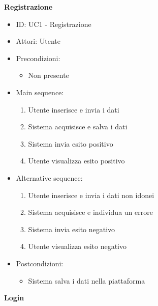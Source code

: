 \documentclass{article}
\begin{document}
\newpage
\textbf{Registrazione}
\begin{itemize}[label = { }]
    \itemsep0px
    \item ID: UC1 - Registrazione
    \item Attori: Utente
    \item Precondizioni: 
        \begin{itemize}[label = {-}]
            \item Non presente
        \end{itemize}
    \item Main sequence: 
        \begin{enumerate}
            \item Utente inserisce e invia i dati
            \item Sistema acquisisce e salva i dati
            \item Sistema invia esito positivo
            \item Utente visualizza esito positivo
        \end{enumerate}
    \item Alternative sequence:
        \begin{enumerate}
            \item Utente inserisce e invia i dati non idonei
            \item Sistema acquisisce e individua un errore
            \item Sistema invia esito negativo
            \item Utente visualizza esito negativo
        \end{enumerate}
    \item Postcondizioni: 
        \begin{itemize}[label = {-}]
            \item Sistema salva i dati nella piattaforma
        \end{itemize}
\end{itemize}
\textbf{Login}
\end{document}
